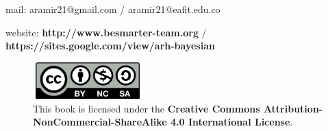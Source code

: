 mail: aramir21@gmail.com / aramir21@eafit.edu.co

website: \textbf{http://www.besmarter-team.org} / \textbf{https://sites.google.com/view/arh-bayesian}

\begin{figure}[h]
	\includegraphics[width=120pt, height=40pt]{frontmatter/figures/by-nc-sa.png}
	\caption[List of figure caption goes here]{This book is licensed under the \textbf{Creative Commons Attribution-NonCommercial-ShareAlike 4.0 International License}.}\label{fig02}
\end{figure}




